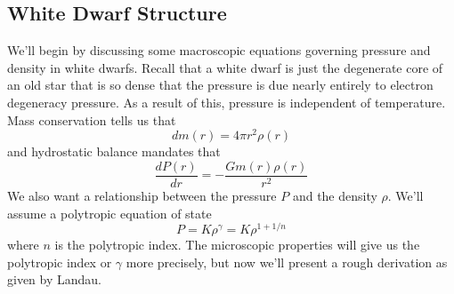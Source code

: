 \documentclass[10pt]{article}
\numberwithin{equation}{section}
\begin{document}
	\subsection{White Dwarf Structure} %
	\label{sub:white_dwarf_structure}
		We'll begin by discussing some macroscopic equations governing pressure and density in white dwarfs. Recall that a white dwarf is just the degenerate core of an old star that is so dense that the pressure is due nearly entirely to electron degeneracy pressure. As a result of this, pressure is independent of temperature. Mass conservation tells us that
		\begin{equation}
			\label{eq:wd_struc:1} dm(r) = 4\pi r^2\rho(r)
		\end{equation}
		and hydrostatic balance mandates that
		\begin{equation}
			\label{eq:wd_struc:2} \frac{dP(r)}{dr} = -\frac{Gm(r)\rho(r)}{r^2}
		\end{equation}
		We also want a relationship between the pressure $P$ and the density $\rho$. We'll assume a polytropic equation of state
		\begin{equation}
			\label{eq:wd_struc:3} P = K\rho^\gamma = K \rho^{1+1/n}
		\end{equation}
		where $n$ is the polytropic index. The microscopic properties will give us the polytropic index or $\gamma$ more precisely, but now we'll present a rough derivation as given by Landau.\\
		
\end{document}

